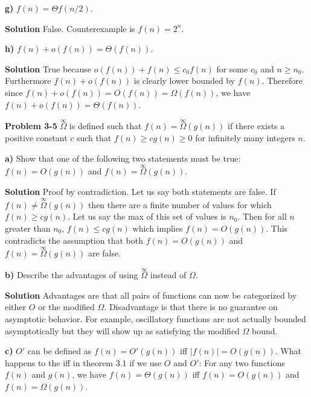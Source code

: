 \documentclass{article}
\begin{document}
\textbf{g)} $f(n) = \Theta{f(n/2)}$.

\medskip

\textbf{Solution} False. Counterexample is $f(n) = 2^n$.

\medskip

\textbf{h)} $f(n) + o(f(n)) = \Theta(f(n))$.

\medskip

\textbf{Solution} True because $o(f(n)) + f(n) \leq c_0f(n)$ for some $c_0$ and $n \geq n_0$. Furthermore $f(n) + o(f(n))$ is clearly lower bounded by $f(n)$. Therefore since $f(n) + o(f(n)) = O(f(n)) = \Omega(f(n))$, we have $f(n) + o(f(n)) = \Theta(f(n))$.

\hrulefill

\medskip

\textbf{Problem 3-5} 
$\overset{\infty}{\Omega}$ is defined such that $f(n) = \overset{\infty}{\Omega}(g(n))$ if there exists a positive constant $c$ such that $f(n) \geq cg(n) \geq 0$ for infinitely many integers $n$.

\medskip

\textbf{a)} Show that one of the following two statements must be true: $f(n) = O(g(n))$ and $f(n) = \overset{\infty}{\Omega}(g(n))$.

\medskip

\textbf{Solution} Proof by contradiction. Let us say both statements are false. If $f(n) \neq \overset{\infty}{\Omega}(g(n))$ then there are a finite number of values for which $f(n) \geq cg(n)$. Let us say the max of this set of values is $n_0$. Then for all $n$ greater than $n_0$, $f(n) \leq cg(n)$ which implies $f(n) = O(g(n))$. This contradicts the assumption that both $f(n) = O(g(n))$ and $f(n) = \overset{\infty}{\Omega}(g(n))$ are false.

\medskip

\textbf{b)} Describe the advantages of using $\overset{\infty}{\Omega}$ instead of $\Omega$.

\medskip

\textbf{Solution} Advantages are that all pairs of functions can now be categorized by either $O$ or the modified $\Omega$. Disadvantage is that there is no guarantee on asymptotic behavior. For example, oscillatory functions are not actually bounded asymptotically but they will show up as satisfying the modified $\Omega$ bound.

\medskip

\textbf{c)} $O'$ can be defined as $f(n) = O'(g(n))$ iff $|f(n)| = O(g(n))$. What happens to the iff in theorem 3.1 if we use $O$ and $O'$: For any two functions $f(n)$ and $g(n)$, we have $f(n) = \Theta(g(n))$ iff $f(n) = O(g(n))$ and $f(n) = \Omega(g(n))$.
\end{document}
